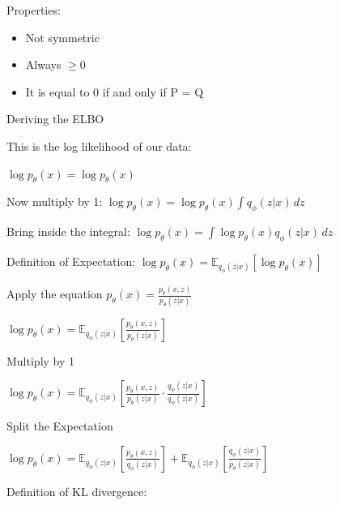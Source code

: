 \documentclass{amsart}
\begin{document}
Properties: \vspace{0.2 cm}

\begin{itemize}
    \item Not symmetric
    \item Always $ \geq 0$
    \item It is equal to 0 if and only if P = Q
\end{itemize}

\vspace{0.2 cm}

Deriving the ELBO \vspace{0.2 cm}

This is the log likelihood of our data:

$\log p_{\theta}(x) = \log p_{\theta}(x)$ \vspace{0.2 cm}

Now multiply by 1: $\log p_{\theta}(x) = \log p_{\theta}(x) \int q_{\phi}(z|x)\,dz $ \vspace{0.2 cm}

Bring inside the integral: $\log p_{\theta}(x) = \int \log p_{\theta}(x)  q_{\phi}(z|x)\,dz $ \vspace{0.2 cm}

Definition of Expectation: $\log p_{\theta}(x) = \mathbb{E}_{q_{\phi}(z|x)}[\log p_{\theta}(x)]$ \vspace{0.2 cm}

Apply the equation $p_{\theta}(x) = \frac{p_{\theta}(x,z)}{p_{\theta}(z|x)}$ \vspace{0.2 cm}

$\log p_{\theta}(x) = \mathbb{E}_{q_{\phi}(z|x)}\left[\frac{p_{\theta}(x,z)}{p_{\theta}(z|x)}\right]$ \vspace{0.2 cm}

Multiply by 1 \vspace{0.2 cm}

$\log p_{\theta}(x) = \mathbb{E}_{q_{\phi}(z|x)}\left[\frac{p_{\theta}(x,z)}{p_{\theta}(z|x)} \cdot \frac{q_{\phi}(z|x)}{q_{\phi}(z|x)}\right]$ \vspace{0.2 cm}

Split the Expectation \vspace{0.2 cm}

$\log p_{\theta}(x) = \mathbb{E}_{q_{\phi}(z|x)}\left[\frac{p_{\theta}(x,z)}{q_{\phi}(z|x)}\right] + \mathbb{E}_{q_{\phi}(z|x)}\left[\frac{q_{\phi}(z|x)}{p_{\theta}(z|x)}\right] $ \vspace{0.2 cm}

Definition of KL divergence: \vspace{0.2 cm}
\end{document}

